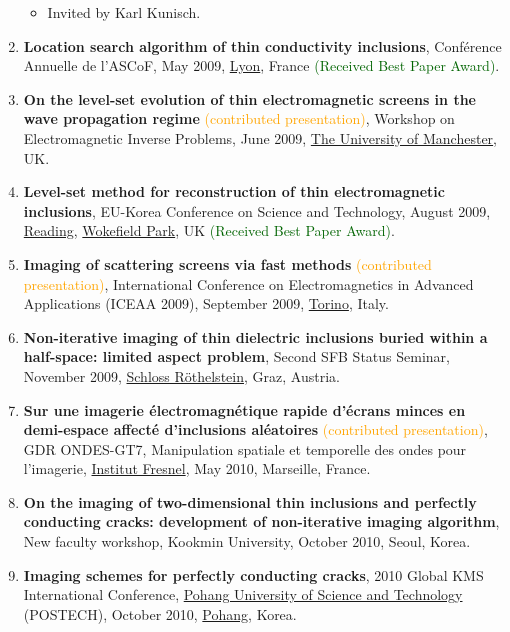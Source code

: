 \documentclass[10pt,A4]{article}
\begin{document}
\begin{enumerate}
\begin{itemize}
\item Invited by Karl Kunisch.
\end{itemize}
\item\label{P-ASCOF2009} \textbf{Location search algorithm of thin conductivity inclusions}, Conf{\'e}rence Annuelle de l'ASCoF, May 2009, \href{https://www.lyon.fr}{Lyon}, France \textcolor{darkgreen}{(Received Best Paper Award)}.
\item\label{P-MANCHESTER2009} \textbf{On the level-set evolution of thin electromagnetic screens in the wave propagation regime} \textcolor{orange}{(contributed presentation)}, Workshop on Electromagnetic Inverse Problems, June 2009, \href{https://www.manchester.ac.uk}{The University of Manchester}, UK.
\item\label{P-EKC2009} \textbf{Level-set method for reconstruction of thin electromagnetic inclusions}, EU-Korea Conference on Science and Technology, August 2009, \href{https://www.visit-reading.com}{Reading}, \href{https://www.devere.co.uk/wokefield-estate/}{Wokefield Park}, UK \textcolor{darkgreen}{(Received Best Paper Award)}.
\item\label{P-ICEAA2009} \textbf{Imaging of scattering screens via fast methods} \textcolor{orange}{(contributed presentation)}, International Conference on Electromagnetics in Advanced Applications (ICEAA 2009), September 2009, \href{http://www.turinitalyguide.com}{Torino}, Italy.
\item\label{P-SFB2009} \textbf{Non-iterative imaging of thin dielectric inclusions buried within a half-space: limited aspect problem}, Second SFB Status Seminar, November 2009, \href{http://www.jufa.at/roethelstein.php}{Schloss R\"othelstein}, Graz, Austria.
\item\label{P-GDR2010} \textbf{Sur une imagerie \'electromagn\'etique rapide d'\'ecrans minces en demi-espace affect\'e d'inclusions al\'eatoires} \textcolor{orange}{(contributed presentation)}, GDR ONDES-GT7, Manipulation spatiale et temporelle des ondes pour l'imagerie, \href{https://www.fresnel.fr/}{Institut Fresnel}, May 2010, Marseille, France.
\item\label{P-KMU2010} \textbf{On the imaging of two-dimensional thin inclusions and perfectly conducting cracks: development of non-iterative imaging algorithm}, New faculty workshop, Kookmin University, October 2010, Seoul, Korea.
\item\label{P-KMS2010} \textbf{Imaging schemes for perfectly conducting cracks}, 2010 Global KMS International Conference, \href{https://postech.ac.kr}{Pohang University of Science and Technology} (POSTECH), October 2010, \href{https://www.pohang.go.kr/intro.html}{Pohang}, Korea.

\end{enumerate}
\end{document}
